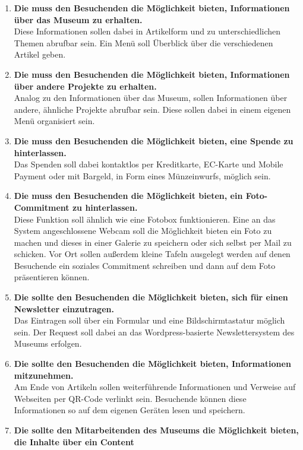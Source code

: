 \begin{enumerate}[label=\textbf{FA\arabic*}]
	\item\label{fa1} \textbf{Die \shst{} muss den Besuchenden die Möglichkeit bieten, Informationen über das Museum zu erhalten.}\\
  Diese Informationen sollen dabei in Artikelform und zu unterschiedlichen Themen abrufbar sein. Ein Menü soll Überblick über 
  die verschiedenen Artikel geben. 
	\item\label{fa2} \textbf{Die \shst{} muss den Besuchenden die Möglichkeit bieten, Informationen über andere Projekte zu erhalten.}\\
  Analog zu den Informationen über das Museum, sollen Informationen über andere, ähnliche Projekte abrufbar sein. Diese sollen dabei
  in einem eigenen Menü organisiert sein.
  \item\label{fa3} \textbf{Die \shst{} muss den Besuchenden die Möglichkeit bieten, eine Spende zu hinterlassen.}\\
  Das Spenden soll dabei kontaktlos per Kreditkarte, EC-Karte und Mobile Payment oder mit Bargeld, in Form eines Münzeinwurfs, möglich sein.
  \item\label{fa4} \textbf{Die \shst{} muss den Besuchenden die Möglichkeit bieten, ein Foto-Commitment zu hinterlassen.}\\
  Diese Funktion soll ähnlich wie eine Fotobox funktionieren. Eine an das System angeschlossene Webcam soll die Möglichkeit bieten ein Foto 
  zu machen und dieses in einer Galerie zu speichern oder sich selbst per Mail zu schicken. Vor Ort sollen außerdem kleine Tafeln ausgelegt werden
  auf denen Besuchende ein soziales Commitment schreiben und dann auf dem Foto präsentieren können. 
  \item\label{fa5} \textbf{Die \shst{} sollte den Besuchenden die Möglichkeit bieten, sich für einen Newsletter einzutragen.}\\ %
  Das Eintragen soll über ein Formular und eine Bildschirmtastatur möglich sein. Der Request soll dabei an das Wordpress-basierte 
  Newslettersystem des Museums erfolgen. 
  \item\label{fa6} \textbf{Die \shst{} sollte den Besuchenden die Möglichkeit bieten, Informationen mitzunehmen.}\\
  Am Ende von Artikeln sollen weiterführende Informationen und Verweise auf Webseiten per QR-Code verlinkt sein. Besuchende können diese 
  Informationen so auf dem eigenen Geräten lesen und speichern. 
  \item\label{fa7} \textbf{Die \shst{} sollte den Mitarbeitenden des Museums die Möglichkeit bieten, die Inhalte über ein Content
}
\end{enumerate}
